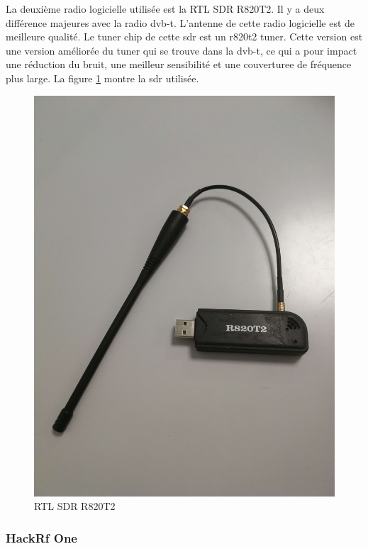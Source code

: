 La deuxième radio logicielle utilisée est la RTL SDR R820T2. Il y a deux différence majeures avec la radio dvb-t. L'antenne de cette radio logicielle est de meilleure qualité. Le tuner chip de cette sdr est un r820t2 tuner. Cette version est une version améliorée du tuner qui se trouve dans la dvb-t, ce qui a pour impact une réduction du bruit, une meilleur sensibilité et une couverturee de fréquence plus large. La figure \ref{term32} montre la sdr utilisée.


\begin{figure}[h]
\centering

\includegraphics[scale=0.08]{images/r820t2.png}
\caption{RTL SDR R820T2}\label{term32}
\end{figure}

\newpage


\subsubsection{HackRf One}

